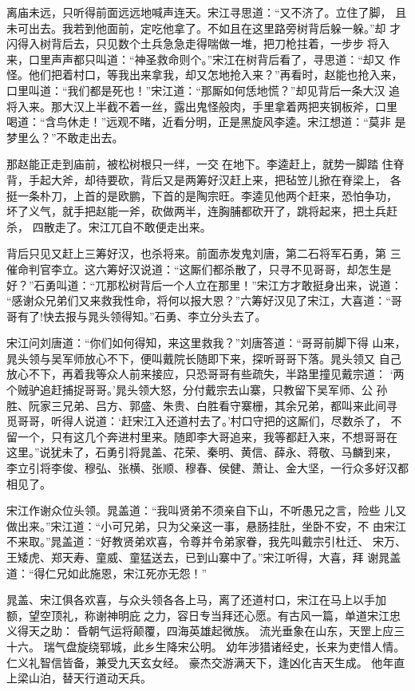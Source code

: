 离庙未远，只听得前面远远地喊声连天。宋江寻思道：“又不济了。立住了脚，
且未可出去。我若到他面前，定吃他拿了。不如且在这里路旁树背后躲一躲。”却
才闪得入树背后去，只见数个土兵急急走得喘做一堆，把刀枪拄着，一步步将入
来，口里声声都只叫道：“神圣救命则个。”宋江在树背后看了，寻思道：“却又
作怪。他们把着村口，等我出来拿我，却又怎地抢入来？”再看时，赵能也抢入来，
口里叫道：“我们都是死也！”宋江道：“那厮如何恁地慌？”却见背后一条大汉
追将入来。那大汉上半截不着一丝，露出鬼怪般肉，手里拿着两把夹钢板斧，口里
喝道：“含鸟休走！”远观不睹，近看分明，正是黑旋风李逵。宋江想道：“莫非
是梦里么？”不敢走出去。

那赵能正走到庙前，被松树根只一绊，一交在地下。李逵赶上，就势一脚踏
住脊背，手起大斧，却待要砍，背后又是两筹好汉赶上来，把毡笠儿掀在脊梁上，
各挺一条朴刀，上首的是欧鹏，下首的是陶宗旺。李逵见他两个赶来，恐怕争功，
坏了义气，就手把赵能一斧，砍做两半，连胸脯都砍开了，跳将起来，把土兵赶杀，
四散走了。宋江兀自不敢便走出来。

背后只见又赶上三筹好汉，也杀将来。前面赤发鬼刘唐，第二石将军石勇，第
三催命判官李立。这六筹好汉说道：“这厮们都杀散了，只寻不见哥哥，却怎生是
好？”石勇叫道：“兀那松树背后一个人立在那里！”宋江方才敢挺身出来，说道：
“感谢众兄弟们又来救我性命，将何以报大恩？”六筹好汉见了宋江，大喜道：“哥
哥有了!快去报与晁头领得知。”石勇、李立分头去了。

宋江问刘唐道：“你们如何得知，来这里救我？”刘唐答道：“哥哥前脚下得
山来，晁头领与吴军师放心不下，便叫戴院长随即下来，探听哥哥下落。晁头领又
自己放心不下，再着我等众人前来接应，只恐哥哥有些疏失，半路里撞见戴宗道：
‘两个贼驴追赶捕捉哥哥。’晁头领大怒，分付戴宗去山寨，只教留下吴军师、公
孙胜、阮家三兄弟、吕方、郭盛、朱贵、白胜看守寨栅，其余兄弟，都叫来此间寻
觅哥哥，听得人说道：‘赶宋江入还道村去了。’村口守把的这厮们，尽数杀了，
不留一个，只有这几个奔进村里来。随即李大哥追来，我等都赶入来，不想哥哥在
这里。”说犹未了，石勇引将晁盖、花荣、秦明、黄信、薛永、蒋敬、马麟到来，
李立引将李俊、穆弘、张横、张顺、穆春、侯健、萧让、金大坚，一行众多好汉都
相见了。

宋江作谢众位头领。晁盖道：“我叫贤弟不须亲自下山，不听愚兄之言，险些
儿又做出来。”宋江道：“小可兄弟，只为父亲这一事，悬肠挂肚，坐卧不安，不
由宋江不来取。”晁盖道：“好教贤弟欢喜，令尊并令弟家眷，我先叫戴宗引杜迁、
宋万、王矮虎、郑天寿、童威、童猛送去，已到山寨中了。”宋江听得，大喜，拜
谢晁盖道：“得仁兄如此施恩，宋江死亦无怨！”

晁盖、宋江俱各欢喜，与众头领各各上马，离了还道村口，宋江在马上以手加
额，望空顶礼，称谢神明庇之力，容日专当拜还心愿。有古风一篇，单道宋江忠
义得天之助：
昏朝气运将颠覆，四海英雄起微族。
流光垂象在山东，天罡上应三十六。
瑞气盘旋绕郓城，此乡生降宋公明。
幼年涉猎诸经史，长来为吏惜人情。
仁义礼智信皆备，兼受九天玄女经。
豪杰交游满天下，逢凶化吉天生成。
他年直上梁山泊，替天行道动天兵。

